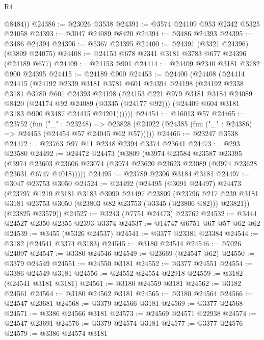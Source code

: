 \begin{lexlean}{R4}
\begin{coremodule}
        @8484))
@24386 := @23026 @3538
@24391 := @3574 @24109 @953 @2342 @5325 @24058
@24393 := @3047 @24089 @8420
@24394 := @3486 @24393
@24395 := @3486 @24394
@24396 := @5367 @24395
@24400 := @24391 (@3321 @24396) (@3809 @24075)
@24408 := @24153 @678 @2341 @3181 @3783 @677 @24396 (@24189 @677)
@24409 := @24153 @901
@24414 := @24409 @2340 @3181 @3782 @900 @24395
@24415 := @24189 @900
@24453 := @24400
    (@24408
      (@24414
        @24415
        (@24192
          @2339
          @3181
          @3781
          @601
          @24394
          @24198
          (@24192
            @2338
            @3181
            @3780
            @601
            @24393
            @24198
            (@24153
              @221
              @979
              @3181
              @3184
              @24089
              @8420
              (@24174 @92 @24089 (@3345 (@24177 @92)))
              (@24409 @604 @3181 @3183 @900 @3487 @24415 @24201))))))
@24454 := @16013 @57
@24465 := @23752
    (fun ("_" : @23248) =>
    @23828 (@24022 (@24385 (fun ("_" : @24386) => @24453 (@24454 @57 @24045 @62 @57)))))
@24466 := @23247 @3538
@24472 := @23763 @97 @11 @2348 @2394 @3374 @23641
@24473 := @293 @23580
@24492 := @24472
    @24473
    (@3809
      (@3974
        @23584
        @23587
        @23395
        (@3974
          @23603
          @23606
          @23074
          (@3974 @23620 @23623 @23089 (@3974 @23628 @23631 @6747 @4018)))))
@24495 := @23789 @2306 @3184 @3181
@24497 := @3047 @23753 @3050
@24524 := @24492
    (@24495
      (@3091 @24497)
      @24473
      (@23797
        @1219
        @3181
        @3183
        @3090
        @24497
        @23809
        (@23796 @217 @239 @3181 @3181 @23753 @3050 (@23803 @82 @23753 (@3345 (@23806 @82))) @23821))
      (@23825 @23579))
@24527 := @3243 (@7751 @24473) @23762
@24532 := @3444 @24527 @2350 @2355 @2393 @3374
@24537 := @14747 @6751 @67 @57 @62 @62
@24539 := @3455 (@5326 @24537)
@24541 := @3377 @23381 @23384
@24544 := @3182 (@24541 @3374 @3183)
@24545 := @3180 @24544
@24546 := @7026 @24097
@24547 := @3380 @24546
@24549 := @23669 (@24547 @62)
@24550 := @3379 @24549
@24551 := @24550 @3181
@24552 := @3377 @24551
@24554 := @3386 @24549 @3181
@24556 := @24552 @24554 @22918
@24559 := @3182 (@24541 @3181 @3181)
@24561 := @3180 @24559 @3181
@24562 := @3182 @24561
@24564 := @3180 @24562 @3181
@24565 := @3180 @24564
@24566 := @24547 @23681
@24568 := @3379 @24566 @3181
@24569 := @3377 @24568
@24571 := @3386 @24566 @3181
@24573 := @24569 @24571 @22938
@24574 := @24547 @23691
@24576 := @3379 @24574 @3181
@24577 := @3377 @24576
@24579 := @3386 @24574 @3181

\end{coremodule}
\end{lexlean}
